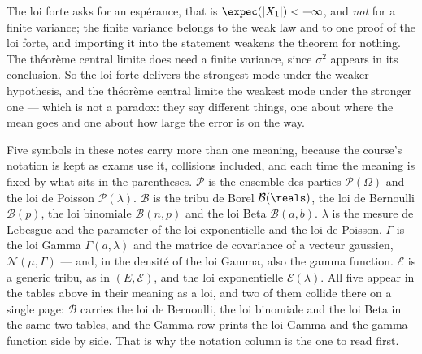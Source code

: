 \begin{remark}
  The loi forte asks for an espérance, that is $\expec(|X_{1}|) < +\infty$, and
  \emph{not} for a finite variance; the finite variance belongs to the weak law and
  to one proof of the loi forte, and importing it into the statement weakens the
  theorem for nothing. The théorème central limite does need a finite variance,
  since $\sigma^{2}$ appears in its conclusion. So the loi forte delivers the
  strongest mode under the weaker hypothesis, and the théorème central limite the
  weakest mode under the stronger one --- which is not a paradox: they say
  different things, one about where the mean goes and one about how large the
  error is on the way.
\end{remark}

\begin{conclusion}
Five symbols in these notes carry more than one meaning, because the course's
notation is kept as exams use it, collisions included, and each time the meaning is fixed by what
sits in the parentheses. $\mathcal{P}$ is the ensemble des parties
$\mathcal{P}(\Omega)$ and the loi de Poisson $\mathcal{P}(\lambda)$. $\mathcal{B}$
is the tribu de Borel $\mathcal{B}(\reals)$, the loi de Bernoulli
$\mathcal{B}(p)$, the loi binomiale $\mathcal{B}(n,p)$ and the loi Beta
$\mathcal{B}(a,b)$. $\lambda$ is the mesure de Lebesgue and the parameter of the
loi exponentielle and the loi de Poisson. $\Gamma$ is the loi Gamma
$\Gamma(a,\lambda)$ and the matrice de covariance of a vecteur gaussien,
$\mathcal{N}(\mu,\Gamma)$ --- and, in the densité of the loi Gamma, also the gamma
function. $\mathcal{E}$ is a generic tribu, as in $(E,\mathcal{E})$, and the loi
exponentielle $\mathcal{E}(\lambda)$. All five appear in the tables above in their
meaning as a loi, and two of them collide there on a single page: $\mathcal{B}$
carries the loi de Bernoulli, the loi binomiale and the loi Beta in the same two
tables, and the Gamma row prints the loi Gamma and the gamma function
side by side. That is why the notation column is the one to read first.
\end{conclusion}
